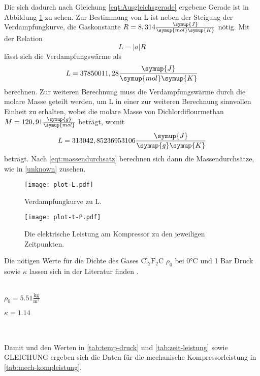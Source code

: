 Die sich dadurch nach Gleichung \eqref{eqt:Ausgleichsgerade} ergebene Gerade ist in Abbildung \ref{fig:dampf} zu sehen.
Zur Bestimmung von L ist neben der Steigung der Verdampfungkurve, die Gaskonstante $R = 8,314 \frac{\symup{J}}{\symup{mol} \symup{K}}$ nötig.
Mit der Relation
\begin{equation}
  L = \lvert a \rvert R
\end{equation}
lässt sich die Verdampfungswärme als
\begin{equation}
  L = 37850011,28 \frac{\symup{J}}{\symup{mol} \symup{K}}
\end{equation}
berechnen.
Zur weiteren Berechnung muss die Verdampfungswärme durch die molare Masse geteilt werden, um L in einer zur weiteren Berechnung sinnvollen Einheit zu erhalten, wobei 
die molare Masse von Dichlordiflourmethan $M = 120,91 \frac{\symup{g}}{\symup{mol} }$ \cite{chemie} beträgt, womit
\begin{equation}
  L =  313042,85236953106 \frac{\symup{J}}{\symup{g} \symup{K}}
\end{equation}
beträgt. Nach \eqref{eqt:massendurchsatz} berechnen sich dann die Massendurchsätze, wie in \autoref{unknown} zusehen.



\begin{figure}
  \centering
  \texttt{[image: plot-L.pdf]}
  \caption{Verdampfungkurve zu L.}
  \label{fig:dampf}
\end{figure}


\begin{figure}
  \centering
  \texttt{[image: plot-t-P.pdf]}
  \caption{Die elektrische Leistung am Kompressor zu den jeweiligen Zeitpunkten.}
  \label{fig:plot_zeit-druck}
\end{figure}

Die nötigen Werte für die Dichte des Gases $\text{Cl}_\text{2}\text{F}_\text{2}\text{C}$ $\rho_0$ bei 0°C und 1 Bar Druck sowie $\kappa$ lassen sich in der Literatur finden \cite{206}.
\\ \\
\centerline{$\rho_0 = 5.51 \frac{\textrm{kg}}{\textrm{m}^3}$}
\centerline{$\kappa = 1.14$}
\\ \\
Damit und den Werten in \autoref{tab:temp-druck} und \autoref{tab:zeit-leistung} sowie GLEICHUNG ergeben sich die Daten für die mechanische Kompressorleistung in \autoref{tab:mech-kompleistung}.

